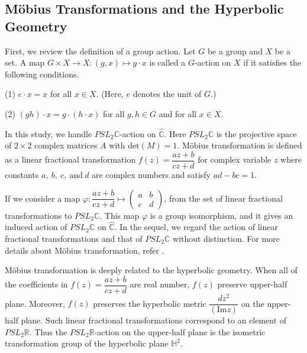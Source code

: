 \subsection{M\"obius Transformations and the Hyperbolic Geometry}

First, we review the definition of a group action. 
Let $G$ be a group and $X$ be a set. A map $G \times X \to X : (g,x) \mapsto g\cdot x$
is called a $G$-action on $X$ if it satisfies the following conditions.
\par \qquad (1) $e \cdot x = x$ for all $x \in X$. (Here, $e$ denotes the unit of $G$.)
\par \qquad (2) $(gh) \cdot x = g \cdot (h\cdot x)$ for all $g, h \in G$ and for all $x \in X$.

In this study, we handle $PSL_2\mathbb{C}$-action on $\hat{\mathbb{C}}$.
Here $PSL_2\mathbb{C}$ is the projective space of $2 \times 2$ complex matrices $A$ with $\mathrm{det}(M)=1$.
M\"obius transformation is defined as a linear fractional transformation
$f(z)=\dfrac{az+b}{cz+d}$ for complex variable $z$ where constants
$a,~b,~c,~\text{and}~d$ are complex numbers and satisfy $ad - bc = 1$.

If we consider a map $\varphi: \dfrac{az+b}{cz+d} \mapsto \begin{pmatrix}a & b \\ c& d \end{pmatrix}$,
from the set of linear fractional transformations to $PSL_2\mathbb{C}$.
This map $\varphi$ is a group isomorphism, and it gives an induced action of $PSL_2\mathbb{C}$ on $\hat{\mathbb{C}}$.
In the sequel, we regard the action of linear fractional transformations
and that of $PSL_2\mathbb{C}$ without distinction.
For more details about M\"obius transformation, refer
\cite{MumfordSeriesWright200204}\cite{marden_2016}.

M\"obius transformation is deeply related to the hyperbolic geometry.
When all of the coefficients in $f(z) = \dfrac{az + b}{cz + d}$
are real number, $f(z)$ preserve upper-half plane.
Moreover, $f(z)$ preserves the hyperbolic metric $\dfrac{dz^2}{(\mathrm{Im}z)}$
on the upper-half plane.
Such linear fractional transformations correspond to an element of $PSL_2\mathbb{R}$.
Thus the $PSL_2\mathbb{R}$-action on the upper-half plane is
the isometric transformation group of the hyperbolic plane $\mathbb{H}^2$.

